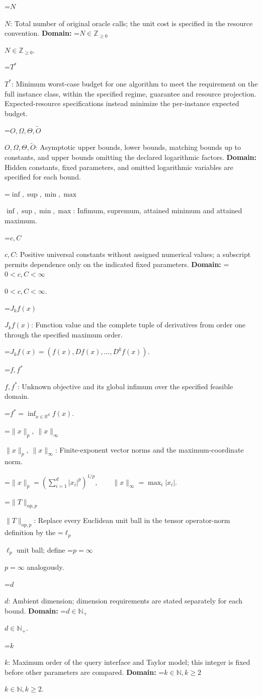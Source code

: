 \documentclass[10pt,a4paper]{article}
\newcommand{\AtlasMath}[1]{\par\begingroup\centering\setbox0=\hbox{$\displaystyle #1$}\ifdim\wd0>1.4\linewidth\typeout{ATLAS WIDE FORMULA: \the\wd0}\fi\ifdim\wd0>\linewidth\resizebox{\linewidth}{!}{\box0}\else\box0\fi\par\endgroup}
\newcommand{\AtlasInlineMath}[1]{\begingroup\setbox0=\hbox{$#1$}\ifdim\wd0>.4\linewidth\endgroup\AtlasMath{#1}\else\endgroup$#1$\fi}
\begin{document}
\AtlasInlineMath{N}: Total number of original oracle calls; the unit cost is specified in the resource convention. \textbf{Domain:} \AtlasInlineMath{N\in\mathbb{Z}_{\ge0}}.

\AtlasInlineMath{T^*}: Minimum worst-case budget for one algorithm to meet the requirement on the full instance class, within the specified regime, guarantee and resource projection. Expected-resource specifications instead minimize the per-instance expected budget.

\AtlasInlineMath{O,\Omega,\Theta,\widetilde{O}}: Asymptotic upper bounds, lower bounds, matching bounds up to constants, and upper bounds omitting the declared logarithmic factors. \textbf{Domain:} Hidden constants, fixed parameters, and omitted logarithmic variables are specified for each bound.

\AtlasInlineMath{\inf,\sup,\min,\max}: Infimum, supremum, attained minimum and attained maximum.

\AtlasInlineMath{c,C}: Positive universal constants without assigned numerical values; a subscript permits dependence only on the indicated fixed parameters. \textbf{Domain:} \AtlasInlineMath{0<c,C<\infty}.

\AtlasInlineMath{J_{k}f(x)}: Function value and the complete tuple of derivatives from order one through the specified maximum order.


\AtlasMath{J_{k}f(x)=(f(x),Df(x),\ldots,D^{k}f(x)).}


\AtlasInlineMath{f,f^*}: Unknown objective and its global infimum over the specified feasible domain.


\AtlasMath{f^*=\inf_{x\in \mathbb{R}^d}f(x).}


\AtlasInlineMath{\|x\|_p,\ \|x\|_\infty}: Finite-exponent vector norms and the maximum-coordinate norm.


\AtlasMath{\|x\|_p=\left(\sum_{i=1}^d|x_i|^p\right)^{1/p},\qquad\|x\|_\infty=\max_i|x_i|.}


\AtlasInlineMath{\|T\|_{\mathrm{op},p}}: Replace every Euclidean unit ball in the tensor operator-norm definition by the \AtlasInlineMath{\ell_p} unit ball; define \AtlasInlineMath{p=\infty} analogously.

\AtlasInlineMath{d}: Ambient dimension; dimension requirements are stated separately for each bound. \textbf{Domain:} \AtlasInlineMath{d\in\mathbb{N}_{+}}.

\AtlasInlineMath{k}: Maximum order of the query interface and Taylor model; this integer is fixed before other parameters are compared. \textbf{Domain:} \AtlasInlineMath{k\in\mathbb{N}, k\ge2}.
\end{document}
